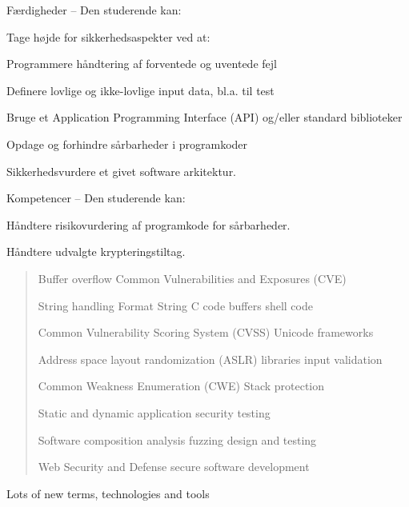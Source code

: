 \documentclass[Screen16to9,17pt]{foils}
\begin{document}
Færdigheder -- Den studerende kan:
\begin{list2}
\item Tage højde for sikkerhedsaspekter ved at:
\item Programmere håndtering af forventede og uventede fejl
\item Definere lovlige og ikke-lovlige input data, bl.a. til test
\item Bruge et Application Programming Interface (API) og/eller standard biblioteker
\item Opdage og forhindre sårbarheder i programkoder
\item Sikkerhedsvurdere et givet software arkitektur.
\end{list2}

Kompetencer -- Den studerende kan:
\begin{list2}
\item Håndtere risikovurdering af programkode for sårbarheder.
\item Håndtere udvalgte krypteringstiltag.
\end{list2}




\begin{quote}\Large
Buffer overflow  Common Vulnerabilities and Exposures (CVE)

String handling  Format String   C code   buffers  shell code

Common Vulnerability Scoring System (CVSS)  Unicode  frameworks

Address space layout randomization (ASLR) libraries input validation

Common Weakness Enumeration (CWE)  Stack protection

Static and dynamic application security testing

Software composition analysis    fuzzing   design and testing

Web Security and Defense   secure software development
\end{quote}

\begin{list2}
\item Lots of new terms, technologies and tools
\end{list2}




\end{document}
